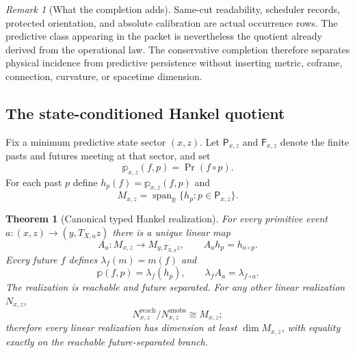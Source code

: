 \documentclass[11pt]{article}
\newtheorem{theorem}{Theorem}[section]
\theoremstyle{definition}
\theoremstyle{remark}
\newtheorem{remark}[remark]{Remark}
\newcommand{\R}{\mathbb R}
\newcommand{\Span}{\operatorname{span}}
\begin{document}
\begin{remark}[What the completion adds]
Same-cut readability, scheduler records, protected orientation, and absolute
calibration are actual occurrence rows.  The predictive class appearing in the
packet is nevertheless the quotient already derived from the operational law.
The conservative completion therefore separates physical incidence from
predictive persistence without inserting metric, coframe, connection,
curvature, or spacetime dimension.
\end{remark}

\subsection{The state-conditioned Hankel quotient}

Fix a minimum predictive state sector $(x,z)$.  Let
$\mathsf P_{x,z}$ and $\mathsf F_{x,z}$ denote the finite pasts and futures
meeting at that sector, and set
\begin{equation}
 \mathbb p_{x,z}(f,p)=\Pr(f\circ p).
 \label{eq:supp-Hankel-table}
\end{equation}
For each past $p$ define $h_p(f)=\mathbb p_{x,z}(f,p)$ and
\begin{equation}
 M_{x,z}=\Span_{\R}\{h_p:p\in\mathsf P_{x,z}\}.
 \label{eq:supp-hankel-space}
\end{equation}

\begin{theorem}[Canonical typed Hankel realization]
\label{thm:supp-hankel}
For every primitive event
$a:(x,z)\to(y,T_{X,a}z)$ there is a unique linear map
\begin{equation}
 A_a:M_{x,z}\longrightarrow M_{y,T_{X,a}z},
 \qquad A_ah_p=h_{a\circ p}.
 \label{eq:supp-hankel-transition}
\end{equation}
Every future $f$ defines $\lambda_f(m)=m(f)$ and
\begin{equation}
 \mathbb p(f,p)=\lambda_f(h_p),
 \qquad
 \lambda_fA_a=\lambda_{f\circ a}.
 \label{eq:supp-hankel-evaluation}
\end{equation}
The realization is reachable and future separated.  For any other linear
realization $N_{x,z}$,
\begin{equation}
 N_{x,z}^{\mathrm{reach}}/N_{x,z}^{\mathrm{unobs}}
 \cong M_{x,z};
 \label{eq:supp-hankel-minimality}
\end{equation}
therefore every linear realization has dimension at least $\dim M_{x,z}$,
with equality exactly on the reachable future-separated branch.
\end{theorem}
\end{document}
